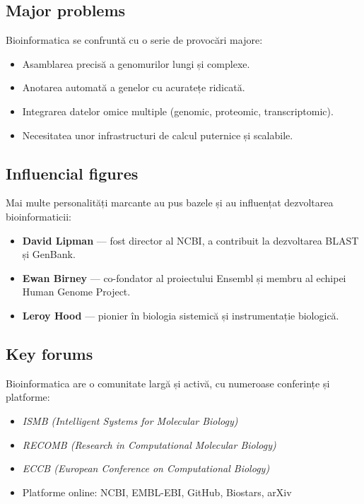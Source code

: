 \documentclass[12pt, letterpaper]{article}
\begin{document}
\subsection*{Major problems}
Bioinformatica se confruntă cu o serie de provocări majore:
\begin{itemize}
    \item Asamblarea precisă a genomurilor lungi și complexe.
    \item Anotarea automată a genelor cu acuratețe ridicată.
    \item Integrarea datelor omice multiple (genomic, proteomic, transcriptomic).
    \item Necesitatea unor infrastructuri de calcul puternice și scalabile.
\end{itemize}

\subsection*{Influencial figures}
Mai multe personalități marcante au pus bazele și au influențat dezvoltarea bioinformaticii:
\begin{itemize}
    \item \textbf{David Lipman} — fost director al NCBI, a contribuit la dezvoltarea BLAST și GenBank.
    \item \textbf{Ewan Birney} — co-fondator al proiectului Ensembl și membru al echipei Human Genome Project.
    \item \textbf{Leroy Hood} — pionier în biologia sistemică și instrumentație biologică.
\end{itemize}

\subsection*{Key forums}
Bioinformatica are o comunitate largă și activă, cu numeroase conferințe și platforme:
\begin{itemize}
    \item \textit{ISMB (Intelligent Systems for Molecular Biology)}
    \item \textit{RECOMB (Research in Computational Molecular Biology)}
    \item \textit{ECCB (European Conference on Computational Biology)}
    \item Platforme online: NCBI, EMBL-EBI, GitHub, Biostars, arXiv
\end{itemize}


\newpage
\end{document}
